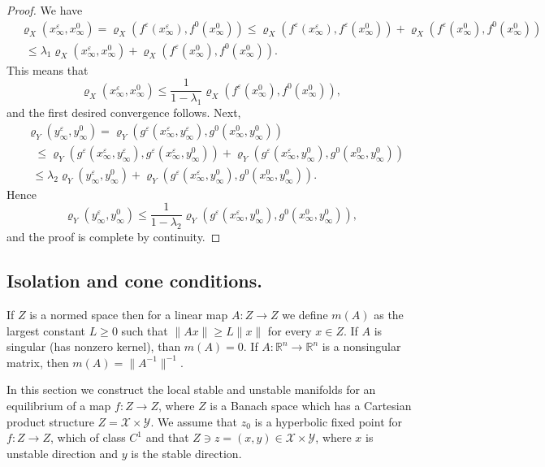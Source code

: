 \documentclass[11pt, leqno]{amsart}
\theoremstyle{definition}
\def\R{\mathbb{R}}
\begin{document}
\begin{proof}
	We have
	\begin{align*}
	& \varrho_X(x_\infty^\varepsilon,x_\infty^0) = \varrho_X(f^\varepsilon(x_\infty^\varepsilon),f^0(x_\infty^0)) \leq \varrho_X(f^\varepsilon(x_\infty^\varepsilon),f^\varepsilon(x_\infty^0))+ \varrho_X(f^\varepsilon(x_\infty^0),f^0(x_\infty^0))\\
	& \ \ \leq \lambda_1 \varrho_X(x_\infty^\varepsilon,x_\infty^0) + \varrho_X(f^\varepsilon(x_\infty^0),f^0(x_\infty^0)).
	\end{align*}
This means that
$$
\varrho_X(x_\infty^\varepsilon,x_\infty^0) \leq \frac{1}{1-\lambda_1} \varrho_X(f^\varepsilon(x_\infty^0),f^0(x_\infty^0)),
$$
and the first desired convergence follows. Next,
	\begin{align*}
	& \varrho_Y(y_\infty^\varepsilon,y_\infty^0) = \varrho_Y(g^\varepsilon(x_\infty^\varepsilon,y_\infty^\varepsilon),g^0(x_\infty^0,y_\infty^0))\\
	& \ \ \ \leq \varrho_Y(g^\varepsilon(x_\infty^\varepsilon,y_\infty^\varepsilon),g^\varepsilon(x_\infty^\varepsilon,y_\infty^0))+ \varrho_Y(g^\varepsilon(x_\infty^\varepsilon,y_\infty^0),g^0(x_\infty^0,y_\infty^0))\\
	& \ \ \leq \lambda_2 \varrho_Y(y_\infty^\varepsilon,y_\infty^0) + \varrho_Y(g^\varepsilon(x_\infty^\varepsilon,y_\infty^0),g^0(x_\infty^0,y_\infty^0)).
\end{align*}
Hence
$$
\varrho_Y(y_\infty^\varepsilon,y_\infty^0) \leq \frac{1}{1-\lambda_2} \varrho_Y(g^\varepsilon(x_\infty^\varepsilon,y_\infty^0),g^0(x_\infty^0,y_\infty^0)),
$$
and the proof is complete by continuity.
	\end{proof}
\subsection{Isolation and cone conditions.}
If $Z$ is a normed space then for a linear map $A:Z\to Z$ we define $m(A)$ as the largest constant $L\geq 0$ such that $\|Ax\|\geq L\|x\|$ for every $x\in Z$. If $A$ is singular (has nonzero kernel), than $m(A) = 0$. If $A:\R^n\to \R^n$ is a nonsingular matrix, then $m(A) = \|A^{-1}\|^{-1}$. 

In this section we construct the local stable and unstable manifolds for an equilibrium of a map $f:Z\to Z$, where $Z$ is a Banach space which has a Cartesian product structure $Z=\mathcal{X}\times \mathcal{Y}$. We assume that $z_0$ is a hyperbolic fixed point for $f: Z \to Z$, which of class $C^1$ and that $Z\ni z=(x,y)\in \mathcal{X}\times \mathcal{Y}$, where $x$ is unstable direction and $y$ is the stable direction.  
\end{document}
